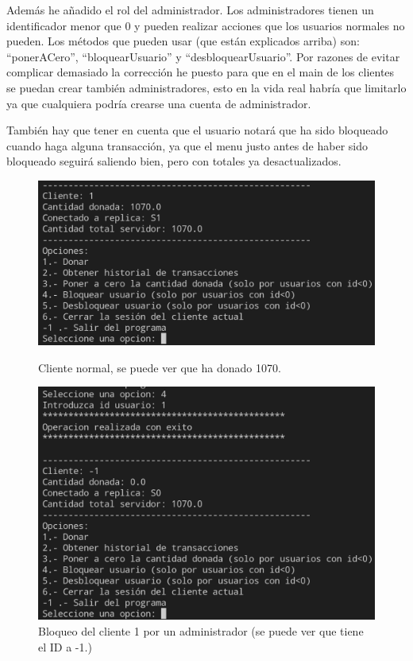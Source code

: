 \documentclass{article}
\begin{document}
Además he añadido el rol del administrador. Los administradores tienen un identificador menor que 0 y pueden realizar acciones que los usuarios normales no pueden. Los métodos que pueden usar (que están explicados arriba) son: ``ponerACero'', ``bloquearUsuario'' y ``desbloquearUsuario''. Por razones de evitar complicar demasiado la corrección he puesto para que en el main de los clientes se puedan crear también administradores, esto en la vida real habría que limitarlo ya que cualquiera podría crearse una cuenta de administrador.

También hay que tener en cuenta que el usuario notará que ha sido bloqueado cuando haga alguna transacción, ya que el menu justo antes de haber sido bloqueado seguirá saliendo bien, pero con totales ya desactualizados.


\begin{figure}[H]
    \centering
    \begin{minipage}[H]{0.45\textwidth}
        \centering
        \includegraphics[width=\textwidth]{imagenes/bloqueo/1.png}
        \caption{Cliente normal, se puede ver que ha donado 1070.}
    \end{minipage}
    \hfill
    \begin{minipage}[H]{0.45\textwidth}
        \centering
        \includegraphics[width=\textwidth]{imagenes/bloqueo/2.png}
        \caption{Bloqueo del cliente 1 por un administrador (se puede ver que tiene el ID a -1.)}
    \end{minipage}
\end{figure}
\end{document}
